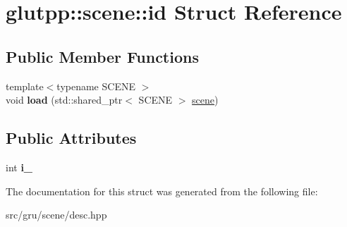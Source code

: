 \hypertarget{structglutpp_1_1scene_1_1id}{\section{glutpp\-:\-:scene\-:\-:id \-Struct \-Reference}
\label{structglutpp_1_1scene_1_1id}
}
\subsection*{\-Public \-Member \-Functions}
\begin{DoxyCompactItemize}
\item 
\hypertarget{structglutpp_1_1scene_1_1id_aee82c6a1569f15f44e1e8cf0fe9aa8b3}{{\footnotesize template$<$typename S\-C\-E\-N\-E $>$ }\\void {\bfseries load} (std\-::shared\-\_\-ptr$<$ \-S\-C\-E\-N\-E $>$ \hyperlink{classglutpp_1_1scene_1_1scene}{scene})}\label{structglutpp_1_1scene_1_1id_aee82c6a1569f15f44e1e8cf0fe9aa8b3}

\end{DoxyCompactItemize}
\subsection*{\-Public \-Attributes}
\begin{DoxyCompactItemize}
\item 
\hypertarget{structglutpp_1_1scene_1_1id_a3e8866fd09f251db2ceea0110fe484bc}{int {\bfseries i\-\_\-}}\label{structglutpp_1_1scene_1_1id_a3e8866fd09f251db2ceea0110fe484bc}

\end{DoxyCompactItemize}


\-The documentation for this struct was generated from the following file\-:\begin{DoxyCompactItemize}
\item 
src/gru/scene/desc.\-hpp\end{DoxyCompactItemize}
